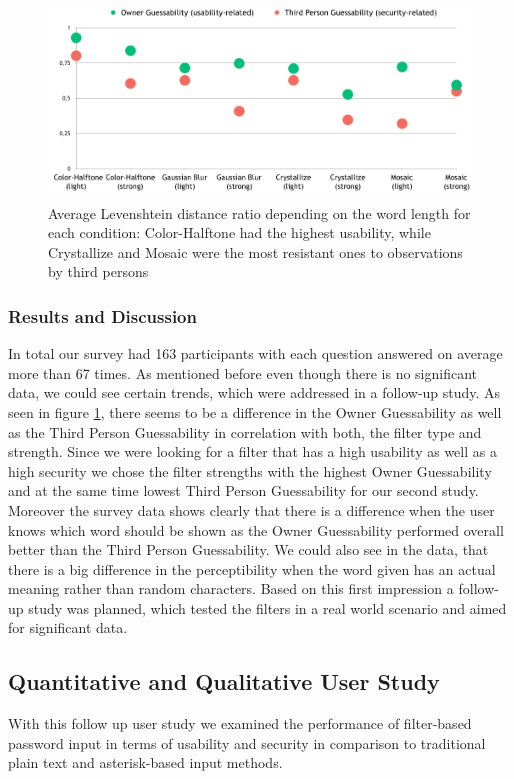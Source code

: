 \documentclass{sigchi}
\begin{document}
\begin{figure}[h]
    \centering
    \includegraphics[width=\columnwidth]{figures/figure1.png}
    \caption{Average Levenshtein distance ratio depending on the word length for each condition: Color-Halftone had the highest usability, while Crystallize and Mosaic were the most resistant ones to observations by third persons}
    \label{fig:online-survey_results}
    \vspace{-5mm}
\end{figure}


\subsubsection{Results and Discussion}
In total our survey had 163 participants with each question answered on average more than 67 times. As mentioned before even though there is no significant data, we could see certain trends, which were addressed in a follow-up study.
As seen in figure \ref{fig:online-survey_results}, there seems to be a difference in the Owner Guessability as well as the Third Person Guessability in correlation with both, the filter type and strength. Since we were looking for a filter that has a high usability as well as a high security we chose the filter strengths with the highest Owner Guessability and at the same time lowest Third Person Guessability for our second study.
Moreover the survey data shows clearly that there is a difference when the user knows which word should be shown as the Owner Guessability performed overall better than the Third Person Guessability. We could also see in the data, that there is a big difference in the perceptibility when the word given has an actual meaning rather than random characters.
Based on this first impression a follow-up study was planned, which tested the filters in a real world scenario and aimed for significant data.

\subsection{Quantitative and Qualitative User Study }
With this follow up user study we examined the performance of filter-based password input in terms of usability and security in comparison to traditional plain text and asterisk-based input methods. 
\end{document}
